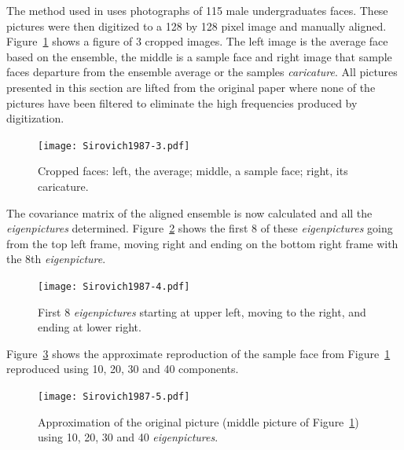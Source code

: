 The method used in \cite{Sirovich1987} uses photographs of 115 male undergraduates faces. These pictures were then digitized to a 128 by 128 pixel image and manually aligned. Figure~\ref{fig:Sirovich1987-3} shows a figure of 3 cropped images. The left image is the average face based on the ensemble, the middle is a sample face and right image that sample faces departure from the ensemble average or the samples \emph{caricature}. All pictures presented in this section are lifted from the original paper \cite{Sirovich1987} where none of the pictures have been filtered to eliminate the high frequencies produced by digitization.

\begin{figure}[!]
  \begin{center}
    \texttt{[image: Sirovich1987-3.pdf]}
    \caption{Cropped faces: left, the average; middle, a sample face; right, its caricature.}\label{fig:Sirovich1987-3}
  \end{center}
\end{figure}

The covariance matrix of the aligned ensemble is now calculated and all the \emph{eigenpictures} determined. Figure~\ref{fig:Sirovich1987-4} shows the first 8 of these \emph{eigenpictures} going from the top left frame, moving right and ending on the bottom right frame with the 8th \emph{eigenpicture}.

\begin{figure}[!]
  \begin{center}
    \texttt{[image: Sirovich1987-4.pdf]}
    \caption{First 8 \emph{eigenpictures} starting at upper left, moving to the right, and ending at lower right.}\label{fig:Sirovich1987-4}
  \end{center}
\end{figure}

Figure~\ref{fig:Sirovich1987-5} shows the approximate reproduction of the sample face from Figure~\ref{fig:Sirovich1987-3} reproduced using 10, 20, 30 and 40 components.

\begin{figure}[!]
  \begin{center}
    \texttt{[image: Sirovich1987-5.pdf]}
    \caption{Approximation of the original picture (middle picture of Figure~\ref{fig:Sirovich1987-3}) using 10, 20, 30 and 40 \emph{eigenpictures}.}\label{fig:Sirovich1987-5}
  \end{center}
\end{figure}



